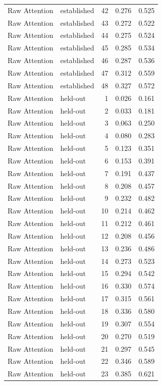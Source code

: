 \begin{tabular}{llrrr}
Raw Attention & established & 42 & 0.276 & 0.525 \\
Raw Attention & established & 43 & 0.272 & 0.522 \\
Raw Attention & established & 44 & 0.275 & 0.524 \\
Raw Attention & established & 45 & 0.285 & 0.534 \\
Raw Attention & established & 46 & 0.287 & 0.536 \\
Raw Attention & established & 47 & 0.312 & 0.559 \\
Raw Attention & established & 48 & 0.327 & 0.572 \\
Raw Attention & held-out & 1 & 0.026 & 0.161 \\
Raw Attention & held-out & 2 & 0.033 & 0.181 \\
Raw Attention & held-out & 3 & 0.063 & 0.250 \\
Raw Attention & held-out & 4 & 0.080 & 0.283 \\
Raw Attention & held-out & 5 & 0.123 & 0.351 \\
Raw Attention & held-out & 6 & 0.153 & 0.391 \\
Raw Attention & held-out & 7 & 0.191 & 0.437 \\
Raw Attention & held-out & 8 & 0.208 & 0.457 \\
Raw Attention & held-out & 9 & 0.232 & 0.482 \\
Raw Attention & held-out & 10 & 0.214 & 0.462 \\
Raw Attention & held-out & 11 & 0.212 & 0.461 \\
Raw Attention & held-out & 12 & 0.208 & 0.456 \\
Raw Attention & held-out & 13 & 0.236 & 0.486 \\
Raw Attention & held-out & 14 & 0.273 & 0.523 \\
Raw Attention & held-out & 15 & 0.294 & 0.542 \\
Raw Attention & held-out & 16 & 0.330 & 0.574 \\
Raw Attention & held-out & 17 & 0.315 & 0.561 \\
Raw Attention & held-out & 18 & 0.336 & 0.580 \\
Raw Attention & held-out & 19 & 0.307 & 0.554 \\
Raw Attention & held-out & 20 & 0.270 & 0.519 \\
Raw Attention & held-out & 21 & 0.297 & 0.545 \\
Raw Attention & held-out & 22 & 0.346 & 0.589 \\
Raw Attention & held-out & 23 & 0.385 & 0.621 \\

\end{tabular}
